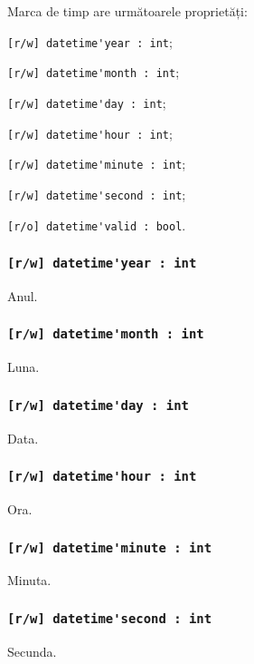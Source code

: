 Marca de timp are următoarele proprietăți:
\begin{icItems}
	\item \lstinline|[r/w] datetime'year : int|;
	\item \lstinline|[r/w] datetime'month : int|;
	\item \lstinline|[r/w] datetime'day : int|;
	\item \lstinline|[r/w] datetime'hour : int|;
	\item \lstinline|[r/w] datetime'minute : int|;
	\item \lstinline|[r/w] datetime'second : int|;
	\item \lstinline|[r/o] datetime'valid : bool|.
\end{icItems}

\subsubsection{\lstinline|[r/w] datetime'year : int|}

Anul.

\subsubsection{\lstinline|[r/w] datetime'month : int|}

Luna.

\subsubsection{\lstinline|[r/w] datetime'day : int|}

Data.

\subsubsection{\lstinline|[r/w] datetime'hour : int|}

Ora.

\subsubsection{\lstinline|[r/w] datetime'minute : int|}

Minuta.

\subsubsection{\lstinline|[r/w] datetime'second : int|}

Secunda.

